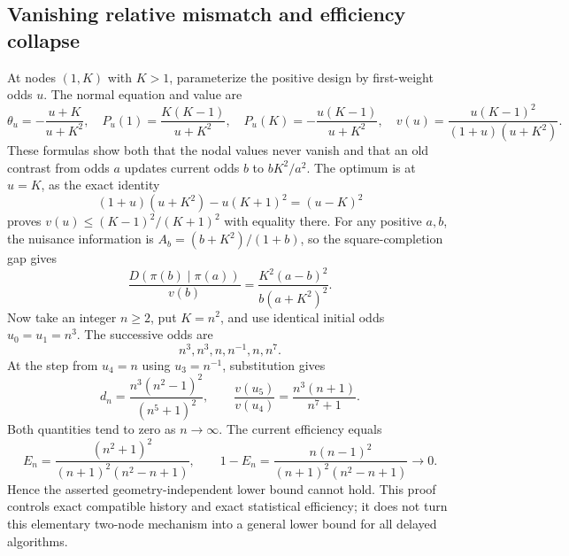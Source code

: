 \documentclass[11pt]{article}
\begin{document}
\subsection{Vanishing relative mismatch and efficiency collapse}
At nodes $(1,K)$ with $K>1$, parameterize the positive design by first-weight odds $u$. The normal equation and value are
\[
 \theta_u=-\frac{u+K}{u+K^2},\quad
 P_u(1)=\frac{K(K-1)}{u+K^2},\quad
 P_u(K)=-\frac{u(K-1)}{u+K^2},\quad
 v(u)=\frac{u(K-1)^2}{(1+u)(u+K^2)}.
\]
These formulas show both that the nodal values never vanish and that an old contrast from odds $a$ updates current odds $b$ to $bK^2/a^2$.
The optimum is at $u=K$, as the exact identity
\[
 (1+u)(u+K^2)-u(K+1)^2=(u-K)^2
\]
proves $v(u)\le(K-1)^2/(K+1)^2$ with equality there.
For any positive $a,b$, the nuisance information is $A_b=(b+K^2)/(1+b)$, so the square-completion gap gives
\[
 \frac{D(\pi(b)\mid\pi(a))}{v(b)}
 =\frac{K^2(a-b)^2}{b(a+K^2)^2}.
\]
Now take an integer $n\ge2$, put $K=n^2$, and use identical initial odds $u_0=u_1=n^3$. The successive odds are
\[
 n^3,n^3,n,n^{-1},n,n^7.
\]
At the step from $u_4=n$ using $u_3=n^{-1}$, substitution gives
\[
 d_n=\frac{n^3(n^2-1)^2}{(n^5+1)^2},\qquad
 \frac{v(u_5)}{v(u_4)}=\frac{n^3(n+1)}{n^7+1}.
\]
Both quantities tend to zero as $n\to\infty$. The current efficiency equals
\[
 E_n=\frac{(n^2+1)^2}{(n+1)^2(n^2-n+1)},\qquad
 1-E_n=\frac{n(n-1)^2}{(n+1)^2(n^2-n+1)}\to0.
\]
Hence the asserted geometry-independent lower bound cannot hold. This proof controls exact compatible history and exact statistical efficiency; it does not turn this elementary two-node mechanism into a general lower bound for all delayed algorithms.
\end{document}
